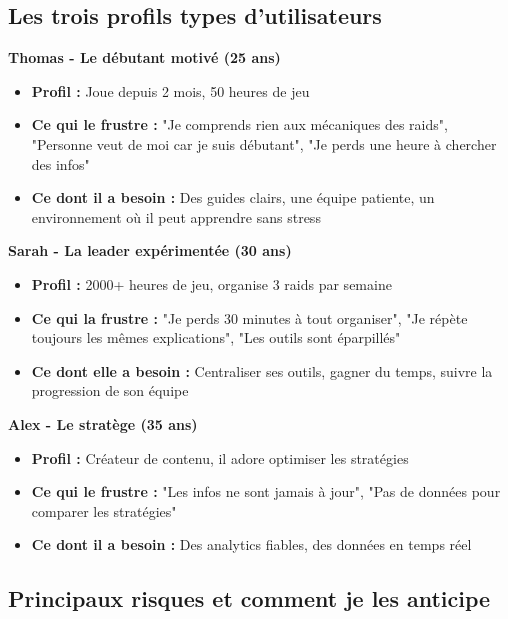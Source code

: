 \subsection*{Les trois profils types d'utilisateurs}

\textbf{Thomas - Le débutant motivé (25 ans)}
\begin{itemize}
    \item \textbf{Profil :} Joue depuis 2 mois, 50 heures de jeu
    \item \textbf{Ce qui le frustre :} "Je comprends rien aux mécaniques des raids", "Personne veut de moi car je suis débutant", "Je perds une heure à chercher des infos"
    \item \textbf{Ce dont il a besoin :} Des guides clairs, une équipe patiente, un environnement où il peut apprendre sans stress
\end{itemize}

\textbf{Sarah - La leader expérimentée (30 ans)}
\begin{itemize}
    \item \textbf{Profil :} 2000+ heures de jeu, organise 3 raids par semaine
    \item \textbf{Ce qui la frustre :} "Je perds 30 minutes à tout organiser", "Je répète toujours les mêmes explications", "Les outils sont éparpillés"
    \item \textbf{Ce dont elle a besoin :} Centraliser ses outils, gagner du temps, suivre la progression de son équipe
\end{itemize}

\textbf{Alex - Le stratège (35 ans)}
\begin{itemize}
    \item \textbf{Profil :} Créateur de contenu, il adore optimiser les stratégies
    \item \textbf{Ce qui le frustre :} "Les infos ne sont jamais à jour", "Pas de données pour comparer les stratégies"
    \item \textbf{Ce dont il a besoin :} Des analytics fiables, des données en temps réel
\end{itemize}

\subsection*{Principaux risques et comment je les anticipe}


